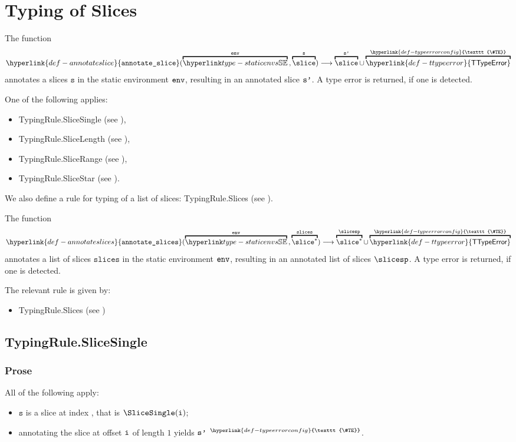 \documentclass{book}
\newcommand\TTypeError[0]{\hyperlink{def-ttypeerror}{\textsf{TTypeError}}}
\newcommand\TypeErrorConfig[0]{\hyperlink{def-typeerrorconfig}{\texttt{\#TE}}}
\newcommand\ProseOrTypeError[0]{\hyperlink{def-proseortypeerror}{$^{\TypeErrorConfig}$}}
\newcommand\annotateslice[0]{\hyperlink{def-annotateslice}{\texttt{annotate\_slice}}}
\newcommand\annotateslices[0]{\hyperlink{def-annotateslices}{\texttt{annotate\_slices}}}
\newcommand\vs[0]{\texttt{s}}
\newcommand\slices[0]{\texttt{slices}}
\begin{document}
\chapter{Typing of Slices \label{chap:typingslices}}
\hypertarget{def-annotateslice}{}
The function
\[
  \annotateslice(\overname{\staticenvs}{\tenv} \aslsep \overname{\slice}{\vs})
  \aslto
  \overname{\slice}{\vsp} \cup \overname{\TTypeError}{\TypeErrorConfig}
\]
annotates a slices $\vs$ in the static environment $\texttt{env}$,
resulting in an annotated slice $\texttt{s'}$.
A type error is returned, if one is detected.

One of the following applies:
\begin{itemize}
\item TypingRule.SliceSingle (see ),
\item TypingRule.SliceLength (see ),
\item TypingRule.SliceRange (see ),
\item TypingRule.SliceStar (see ).
\end{itemize}

We also define a rule for typing of a list of slices:
TypingRule.Slices (see ).

\hypertarget{def-annotateslices}{}
The function
\[
  \annotateslices(\overname{\staticenvs}{\tenv} \aslsep \overname{\slice^*}{\slices})
  \aslto
  \overname{\slice^*}{\slicesp} \cup \overname{\TTypeError}{\TypeErrorConfig}
\]
annotates a list of slices $\slices$ in the static environment $\texttt{env}$,
resulting in an annotated list of slices $\slicesp$.
A type error is returned, if one is detected.

The relevant rule is given by:
\begin{itemize}
  \item TypingRule.Slices (see )
\end{itemize}

\section{TypingRule.SliceSingle \label{sec:TypingRule.SliceSingle}}

\subsection{Prose}
All of the following apply:
\begin{itemize}
  \item $\vs$ is a slice at index \vi, that is $\SliceSingle(\vi)$;
  \item annotating the slice at offset $\texttt{i}$ of length $1$ yields $\texttt{s'}$ \ProseOrTypeError.
\end{itemize}
\end{document}
